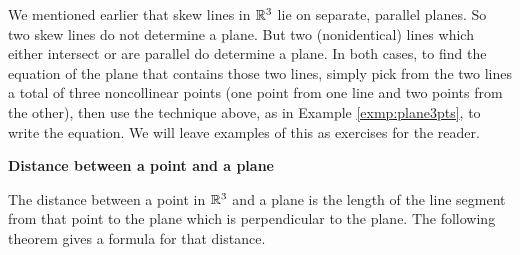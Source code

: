 We mentioned earlier that skew lines in $\mathbb{R}^{3}$ lie on separate, parallel planes. 
So two skew lines do not determine
a plane. 
But two (nonidentical) lines which either intersect or are parallel do determine a plane. 
In both cases, to
find the equation of the plane that contains those two lines, simply pick from the two lines a total of three
noncollinear points (one point from one line and two points from the other), then use the technique above, as in
Example \ref{exmp:plane3pts}, to write the equation. We will leave examples of this as exercises for the reader.
\pagebreak[3]
\par\noindent\textbf{\large{Distance between a point and a plane}}\normalsize\smallskip

The distance between a point in $\mathbb{R}^{3}$ and a plane is the length of the line segment from that point to the plane
which is perpendicular to the plane. 
The following theorem gives a formula for that distance.
